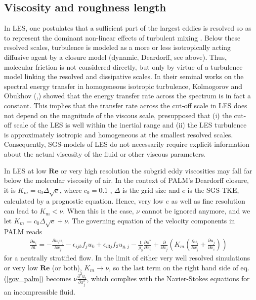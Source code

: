 \documentclass[a4paper,11pt]{article}
\newcommand{\RE}{\mathbf{Re}}
\begin{document}
\subsection{Viscosity and roughness length}

In LES, one postulates that a sufficient part of the largest eddies is resolved so as to represent the dominant non-linear effects of turbulent mixing \citep{pope2004ten}. Below these resolved scales, turbulence is modeled as a more or less isotropically acting diffusive agent by a closure model (dynamic, Deardorff, see above). Thus, molecular friction is not considered directly, but only by virtue of a turbulence model linking the resolved and dissipative scales. In their seminal works on the spectral energy transfer in homogeneous isotropic turbulence, Kolmogorov and Obukhov (\cite{kolmogorov1941dissipation},\cite{obukhov1941distribution}) showed that the energy transfer rate across the spectrum is in fact a constant. This implies that the transfer rate across the cut-off scale in LES does not depend on the magnitude of the viscous scale, presupposed that (i) the cut-off scale of the LES is well within the inertial range and (ii) the LES turbulence is approximately isotropic and homogeneous at the smallest resolved scales. Consequently, SGS-models of LES do not necessarily require explicit information about the actual viscosity of the fluid or other viscous parameters.

In LES at low $\RE$ or very high resolution the subgrid eddy viscosities may fall far below the molecular viscosity of air. In the context of PALM's Deardorff closure, it is $K_m = c_0 \Delta \sqrt{e}$, where $c_0 = 0.1$ \citep{deardorff1980stratocumulus}, $\Delta$ is the grid size and $e$ is the SGS-TKE, calculated by a prognostic equation. Hence, very low $e$ as well as fine resolution can lead to $K_m<\nu$. When this is the case, $\nu$ cannot be ignored anymore, and we let $K_m = c_0 \Delta \sqrt{e} + \nu$. The governing equation of the velocity components in PALM reads
\begin{align}\label{gov_palm}
  \frac{\partial u_i}{\partial t} = - \frac{\partial u_i u_j}{\partial x_j} -\epsilon_{ijk}f_ju_k + \epsilon_{i3j} f_3 u_{g,j} - \frac{1}{\rho_0}\frac{\partial\pi^*}{\partial x_i} + \frac{\partial}{\partial x_j}\left( K_m\left(\frac{\partial u_i}{\partial x_j} + \frac{\partial u_j}{\partial x_i} \right)\right)
\end{align}
for a neutrally stratified flow. In the limit of either very well resolved simulations or very low $\RE$ (or both), $K_m \rightarrow \nu$, so the last term on the right hand side of eq. (\ref{gov_palm}) becomes $\nu\frac{\partial^2u_i}{\partial x_j^2}$, which complies with the Navier-Stokes equations for an incompressible fluid.
\end{document}
